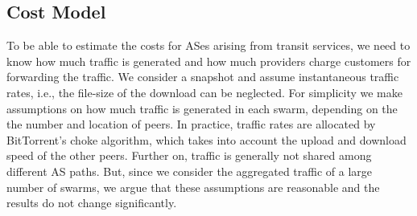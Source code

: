 
\subsection{Cost Model}

To be able to estimate the costs for ASes arising from transit services, we need to know how much traffic is generated and how much providers charge customers for forwarding the traffic.
We consider a snapshot and assume instantaneous traffic rates, i.e., the file-size of the download can be neglected.
For simplicity we make assumptions on how much traffic is generated in each swarm, depending on the the number and location of peers.
In practice, traffic rates are allocated by BitTorrent's choke algorithm, which takes into account the upload and download speed of the other peers. Further on, traffic is generally not shared among different AS paths. But, since we consider the aggregated traffic of a large number of swarms, we argue that these assumptions are reasonable and the results do not change significantly.
